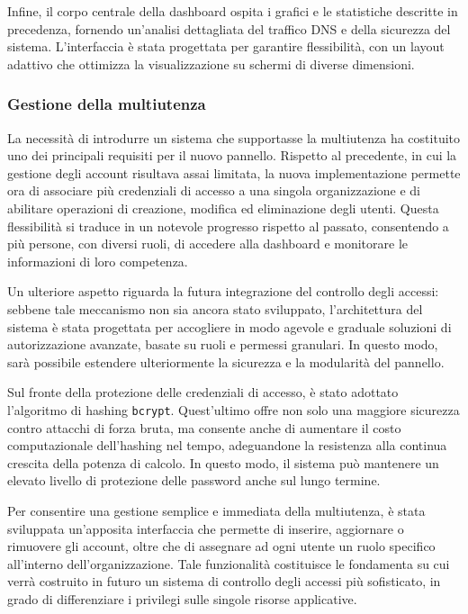 Infine, il corpo centrale della dashboard ospita i grafici e le statistiche descritte in precedenza, fornendo un’analisi dettagliata del traffico DNS e della sicurezza del sistema. L’interfaccia è stata progettata per garantire flessibilità, con un layout adattivo che ottimizza la visualizzazione su schermi di diverse dimensioni.

\subsubsection{Gestione della multiutenza}
La necessità di introdurre un sistema che supportasse la multiutenza ha costituito uno dei principali requisiti per il nuovo pannello. Rispetto al precedente, in cui la gestione degli account risultava assai limitata, la nuova implementazione permette ora di associare più credenziali di accesso a una singola organizzazione e di abilitare operazioni di creazione, modifica ed eliminazione degli utenti. Questa flessibilità si traduce in un notevole progresso rispetto al passato, consentendo a più persone, con diversi ruoli, di accedere alla dashboard e monitorare le informazioni di loro competenza.

Un ulteriore aspetto riguarda la futura integrazione del controllo degli accessi: sebbene tale meccanismo non sia ancora stato sviluppato, l’architettura del sistema è stata progettata per accogliere in modo agevole e graduale soluzioni di autorizzazione avanzate, basate su ruoli e permessi granulari. In questo modo, sarà possibile estendere ulteriormente la sicurezza e la modularità del pannello.

Sul fronte della protezione delle credenziali di accesso, è stato adottato l’algoritmo di hashing \texttt{bcrypt}. Quest’ultimo offre non solo una maggiore sicurezza contro attacchi di forza bruta, ma consente anche di aumentare il costo computazionale dell’hashing nel tempo, adeguandone la resistenza alla continua crescita della potenza di calcolo. In questo modo, il sistema può mantenere un elevato livello di protezione delle password anche sul lungo termine.

Per consentire una gestione semplice e immediata della multiutenza, è stata sviluppata un’apposita interfaccia che permette di inserire, aggiornare o rimuovere gli account, oltre che di assegnare ad ogni utente un ruolo specifico all’interno dell’organizzazione. Tale funzionalità costituisce le fondamenta su cui verrà costruito in futuro un sistema di controllo degli accessi più sofisticato, in grado di differenziare i privilegi sulle singole risorse applicative.

